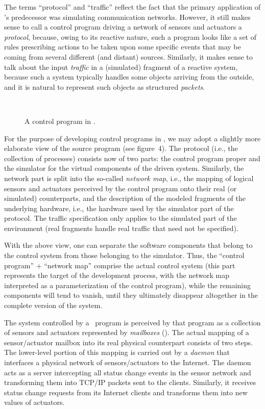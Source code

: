 The terms ``protocol'' and ``traffic'' reflect the fact that the primary
application of {\smurph}'s predecessor was simulating communication
networks.
However, it still makes sense to call a control program driving a network
of sensors and actuators a {\em protocol}, because, owing to its reactive
nature, such a program looks like a set of rules prescribing actions to be
taken upon some specific events that may be coming from several different
(and distant) sources.
Similarly, it makes sense to talk about the input {\em traffic\/} in a
(simulated) fragment of a reactive system, because such a system typically
handles some objects arriving from the outside, and it is natural to
represent such objects as structured {\em packets}.

\begin{figure}[htbp]%
\begin{center}
\ 
\caption{A control program in {\smurph}.}%
\end{center}
\end{figure}%

For the purpose of developing control programs in \smurph, we
may adopt a slightly
more elaborate view of the source program (see
figure~4).
The protocol (i.e., the collection of processes) consists now of two parts:
the control program proper and the simulator for the virtual components of
the driven system.
Similarly, the network part is split into the so-called {\em network map},
i.e., the mapping of logical sensors and actuators perceived by the
control program onto their real (or simulated) counterparts,
and the description of the modeled fragments of the underlying hardware, i.e.,
the hardware used by the simulator part of the protocol.
The traffic specification only applies to the simulated part of the environment
(real fragments handle real traffic that need not be specified).

With the above view, one can separate the software components that
belong to the control system from those belonging to the simulator.
Thus, the ``control program'' + ``network map'' comprise the actual
control system (this part represents the target of the development
process, with the network map interpreted as a parameterization of the
control program), while the remaining components will tend to vanish,
until they ultimately disappear altogether in the complete version of
the system.

The system controlled by a \smurph\ program is perceived by that program
as a collection of sensors and actuators represented by
{\em mailboxes\/} ().
The actual mapping of a sensor/actuator mailbox into its real physical
counterpart consists of two steps.
The lower-level portion of this mapping is carried out by a {\em daemon\/} that
interfaces a physical network of sensors/actuators to the Internet.
The daemon acts as a server
intercepting all status change events in the sensor network and transforming
them into TCP/IP packets sent to the clients.
Similarly, it receives status change requests from its Internet
clients and transforms them into new values of actuators.

